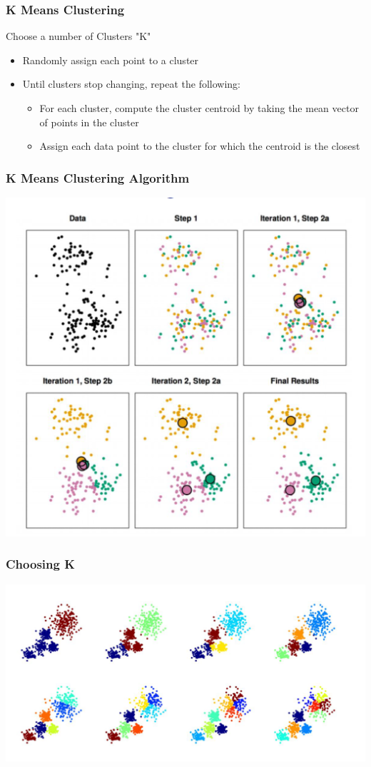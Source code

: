 \documentclass[compress, aspectratio=54]{beamer}
\begin{document}
\begin{frame}
\frametitle{K Means Clustering}
Choose a number of Clusters "K"
\begin{itemize}
\item Randomly assign each point to a cluster
\item Until clusters stop changing, repeat the following:
\begin{itemize}
\item For each cluster, compute the cluster centroid by
taking the mean vector of points in the cluster
\item Assign each data point to the cluster for which the
centroid is the closest

\end{itemize}
\end{itemize}

\end{frame}

\begin{frame}
\frametitle{K Means Clustering Algorithm}
\centering
\includegraphics[width=0.45\linewidth ]{Figures/kmeans_algorithm.png}


\end{frame}


\begin{frame}
\frametitle{Choosing K}
\includegraphics[width=0.85\linewidth ]{Figures/choosing_k.png}


\end{frame}
\end{document}
